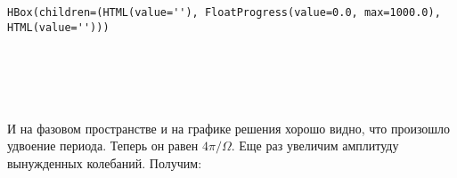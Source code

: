\documentclass[11pt]{article}
\begin{document}
    
    \begin{Verbatim}[commandchars=\\\{\}]
HBox(children=(HTML(value=''), FloatProgress(value=0.0, max=1000.0), HTML(value='')))
    \end{Verbatim}

    
    \begin{Verbatim}[commandchars=\\\{\}]

    \end{Verbatim}

    \begin{center}
    \end{center}
    { \hspace*{\fill} \\}
    
    \begin{center}
    \end{center}
    { \hspace*{\fill} \\}
    
    И на фазовом пространстве и на графике решения хорошо видно, что
произошло удвоение периода. Теперь он равен \(4 \pi / \Omega\). Еще раз
увеличим амплитуду вынужденных колебаний. Получим:
\end{document}

